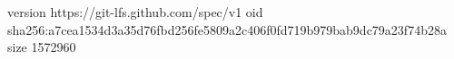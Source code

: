 version https://git-lfs.github.com/spec/v1
oid sha256:a7cea1534d3a35d76fbd256fe5809a2c406f0fd719b979bab9dc79a23f74b28a
size 1572960
